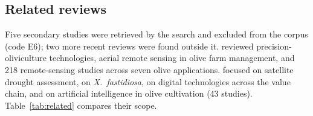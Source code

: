 \documentclass[preprint,12pt]{elsarticle}
\begin{document}
\subsection{Related reviews}\label{sec:related}
 
Five secondary studies were retrieved by the search and excluded from the corpus (code E6); two more recent reviews \citep{Marques2024Advancements,Mendes2026Empowering} were found outside it. \citet{roma2022precision} reviewed precision-oliviculture technologies, \citet{messina2022role} aerial remote sensing in olive farm management, and \citet{Marques2024Advancements} 218 remote-sensing studies across seven olive applications. \citet{crespo2024satellite} focused on satellite drought assessment, \citet{hadji2024xylella} on \textit{X.~fastidiosa}, \citet{parralopez2025digital} on digital technologies across the value chain, and \citet{Mendes2026Empowering} on artificial intelligence in olive cultivation (43 studies). Table~\ref{tab:related} compares their scope.
 
\end{document}
